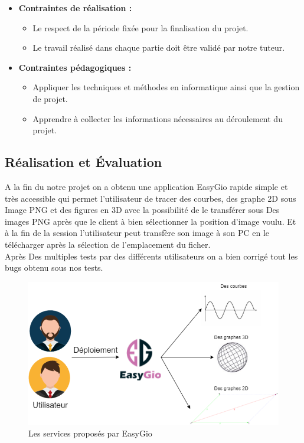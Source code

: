 \documentclass[a4paper]{report}
\begin{document}
\begin{itemize}
    \item \textbf{Contraintes de réalisation : }
    \begin{itemize}
        \item Le respect de la période fixée pour la finalisation du projet.
        \item Le travail réalisé dans chaque partie doit être validé par notre tuteur. 
    \end{itemize}\smallskip
    \item \textbf{Contraintes pédagogiques : }
    \begin{itemize}
        \item Appliquer les techniques et méthodes en informatique ainsi que la gestion de projet. 
        
        \item Apprendre à collecter les informations nécessaires au déroulement du projet.
    \end{itemize}    
\end{itemize}
\subsection{Réalisation et Évaluation}
A la fin du notre projet on a obtenu une application EasyGio rapide simple et très accessible qui permet l’utilisateur de tracer des courbes, des graphe 2D sous Image PNG et des figures en 3D avec la possibilité de le transférer sous Des images PNG après que le client à bien sélectionner la position d’image voulu. Et à la fin de la session l’utilisateur peut transfère son image à son PC en le télécharger après la sélection de l’emplacement du ficher.\\
Après Des multiples tests par des différents utilisateurs on a bien corrigé tout les bugs obtenu sous nos tests.
\begin{figure}[!h]
    \centering
    \includegraphics[width=14cm]{images/EasyGioServices.png}
    \caption{Les services proposés par EasyGio}
    \label{fig:Les services proposés par EasyGio}
\end{figure}
\end{document}
